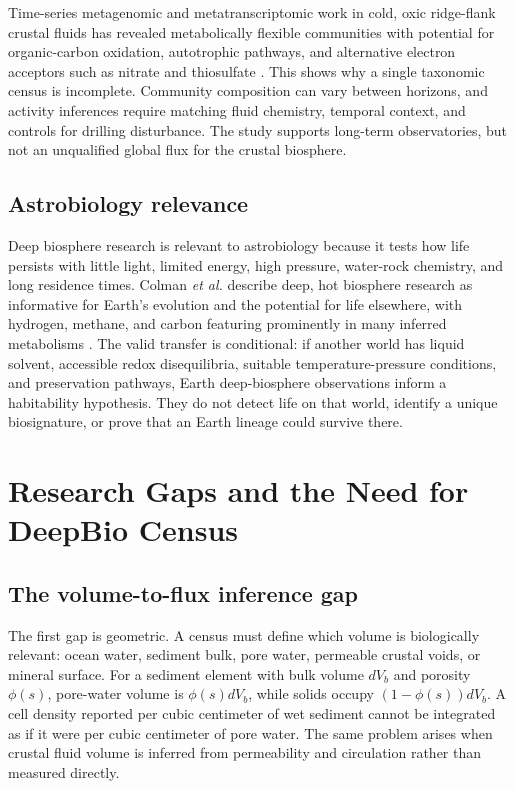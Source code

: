 \documentclass[conference]{../../../../Conference-LaTeX-template_10-17-19/IEEEtran}
\begin{document}
Time-series metagenomic and metatranscriptomic work in cold, oxic ridge-flank crustal fluids has revealed metabolically flexible communities with potential for organic-carbon oxidation, autotrophic pathways, and alternative electron acceptors such as nitrate and thiosulfate \cite{seyler2020}. This shows why a single taxonomic census is incomplete. Community composition can vary between horizons, and activity inferences require matching fluid chemistry, temporal context, and controls for drilling disturbance. The study supports long-term observatories, but not an unqualified global flux for the crustal biosphere.

\subsection{Astrobiology relevance}
Deep biosphere research is relevant to astrobiology because it tests how life persists with little light, limited energy, high pressure, water-rock chemistry, and long residence times. Colman \textit{et al.} describe deep, hot biosphere research as informative for Earth's evolution and the potential for life elsewhere, with hydrogen, methane, and carbon featuring prominently in many inferred metabolisms \cite{colman2017}. The valid transfer is conditional: if another world has liquid solvent, accessible redox disequilibria, suitable temperature-pressure conditions, and preservation pathways, Earth deep-biosphere observations inform a habitability hypothesis. They do not detect life on that world, identify a unique biosignature, or prove that an Earth lineage could survive there.

\section{Research Gaps and the Need for DeepBio Census}
\subsection{The volume-to-flux inference gap}
The first gap is geometric. A census must define which volume is biologically relevant: ocean water, sediment bulk, pore water, permeable crustal voids, or mineral surface. For a sediment element with bulk volume $dV_b$ and porosity $\phi(s)$, pore-water volume is $\phi(s)dV_b$, while solids occupy $(1-\phi(s))dV_b$. A cell density reported per cubic centimeter of wet sediment cannot be integrated as if it were per cubic centimeter of pore water. The same problem arises when crustal fluid volume is inferred from permeability and circulation rather than measured directly.
\end{document}
